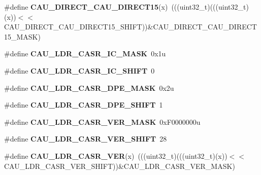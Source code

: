 \begin{DoxyCompactItemize}
\item 
\#define {\bfseries C\+A\+U\+\_\+\+D\+I\+R\+E\+C\+T\+\_\+\+C\+A\+U\+\_\+\+D\+I\+R\+E\+C\+T15}(x)~(((uint32\+\_\+t)(((uint32\+\_\+t)(x))$<$$<$C\+A\+U\+\_\+\+D\+I\+R\+E\+C\+T\+\_\+\+C\+A\+U\+\_\+\+D\+I\+R\+E\+C\+T15\+\_\+\+S\+H\+I\+FT))\&C\+A\+U\+\_\+\+D\+I\+R\+E\+C\+T\+\_\+\+C\+A\+U\+\_\+\+D\+I\+R\+E\+C\+T15\+\_\+\+M\+A\+SK)\hypertarget{group__CAU__Register__Masks_gaa12d64f2daab5410099ff5be09345b3d}{}\label{group__CAU__Register__Masks_gaa12d64f2daab5410099ff5be09345b3d}

\item 
\#define {\bfseries C\+A\+U\+\_\+\+L\+D\+R\+\_\+\+C\+A\+S\+R\+\_\+\+I\+C\+\_\+\+M\+A\+SK}~0x1u\hypertarget{group__CAU__Register__Masks_gae9945a982ee40a35ec7c92d32fd9956a}{}\label{group__CAU__Register__Masks_gae9945a982ee40a35ec7c92d32fd9956a}

\item 
\#define {\bfseries C\+A\+U\+\_\+\+L\+D\+R\+\_\+\+C\+A\+S\+R\+\_\+\+I\+C\+\_\+\+S\+H\+I\+FT}~0\hypertarget{group__CAU__Register__Masks_ga262e6d420bd6efa036c7c6f8a3431c46}{}\label{group__CAU__Register__Masks_ga262e6d420bd6efa036c7c6f8a3431c46}

\item 
\#define {\bfseries C\+A\+U\+\_\+\+L\+D\+R\+\_\+\+C\+A\+S\+R\+\_\+\+D\+P\+E\+\_\+\+M\+A\+SK}~0x2u\hypertarget{group__CAU__Register__Masks_ga591913fd850627ba4dbbe23dff834f4e}{}\label{group__CAU__Register__Masks_ga591913fd850627ba4dbbe23dff834f4e}

\item 
\#define {\bfseries C\+A\+U\+\_\+\+L\+D\+R\+\_\+\+C\+A\+S\+R\+\_\+\+D\+P\+E\+\_\+\+S\+H\+I\+FT}~1\hypertarget{group__CAU__Register__Masks_gab1825cdea4d35d62af51b40a80524a61}{}\label{group__CAU__Register__Masks_gab1825cdea4d35d62af51b40a80524a61}

\item 
\#define {\bfseries C\+A\+U\+\_\+\+L\+D\+R\+\_\+\+C\+A\+S\+R\+\_\+\+V\+E\+R\+\_\+\+M\+A\+SK}~0x\+F0000000u\hypertarget{group__CAU__Register__Masks_gac3ea78b4eacaf7b3cf614dee61564e86}{}\label{group__CAU__Register__Masks_gac3ea78b4eacaf7b3cf614dee61564e86}

\item 
\#define {\bfseries C\+A\+U\+\_\+\+L\+D\+R\+\_\+\+C\+A\+S\+R\+\_\+\+V\+E\+R\+\_\+\+S\+H\+I\+FT}~28\hypertarget{group__CAU__Register__Masks_ga6c0cd608dfa284be126e88595cfef13c}{}\label{group__CAU__Register__Masks_ga6c0cd608dfa284be126e88595cfef13c}

\item 
\#define {\bfseries C\+A\+U\+\_\+\+L\+D\+R\+\_\+\+C\+A\+S\+R\+\_\+\+V\+ER}(x)~(((uint32\+\_\+t)(((uint32\+\_\+t)(x))$<$$<$C\+A\+U\+\_\+\+L\+D\+R\+\_\+\+C\+A\+S\+R\+\_\+\+V\+E\+R\+\_\+\+S\+H\+I\+FT))\&C\+A\+U\+\_\+\+L\+D\+R\+\_\+\+C\+A\+S\+R\+\_\+\+V\+E\+R\+\_\+\+M\+A\+SK)\hypertarget{group__CAU__Register__Masks_gaba538fe03e857a34dab8ed29bcc127f8}{}\label{group__CAU__Register__Masks_gaba538fe03e857a34dab8ed29bcc127f8}


\end{DoxyCompactItemize}
